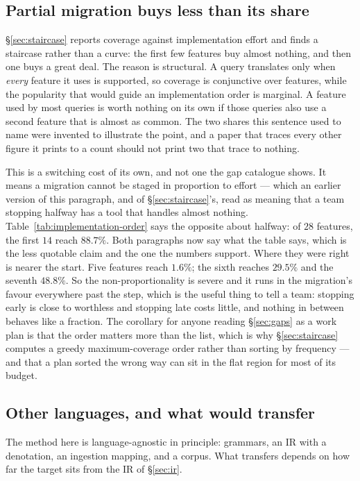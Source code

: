 \subsection{Partial migration buys less than its share}

\S\ref{sec:staircase} reports coverage against implementation effort and finds a
staircase rather than a curve: the first few features buy almost nothing, and then one
buys a great deal. The reason is structural. A query translates only when \emph{every}
feature it uses is supported, so coverage is conjunctive over features, while the
popularity that would guide an implementation order is marginal. A feature used by
most queries is worth nothing on its own if those queries also use a second feature that
is almost as common. The two shares this sentence used to name were invented to
illustrate the point, and a paper that traces every other figure it prints to a count
should not print two that trace to nothing.

This is a switching cost of its own, and not one the gap catalogue shows. It means a
migration cannot be staged in proportion to effort --- which an earlier version of this
paragraph, and of \S\ref{sec:staircase}'s, read as meaning that a team stopping halfway
has a tool that handles almost nothing. Table~\ref{tab:implementation-order} says the
opposite about halfway: of $28$ features, the first $14$ reach $88.7\%$. Both paragraphs
now say what the table says, which is the less quotable claim and the one the numbers
support. Where they were right is nearer the start. Five
features reach $1.6\%$; the sixth reaches $29.5\%$ and the seventh $48.8\%$. So the non-proportionality is severe and it runs in the migration's
favour everywhere past the step, which is the useful thing to tell a team: stopping
early is close to worthless and stopping late costs little, and nothing in between
behaves like a fraction. The corollary for anyone reading \S\ref{sec:gaps} as a work
plan is that the order matters more than the list, which is why
\S\ref{sec:staircase} computes a greedy maximum-coverage
order rather than sorting by frequency --- and that a plan sorted the wrong way can sit
in the flat region for most of its budget.

\subsection{Other languages, and what would transfer}

The method here is language-agnostic in principle: grammars, an IR with a denotation, an
ingestion mapping, and a corpus. What transfers depends on how far the target sits from
the IR of \S\ref{sec:ir}.

